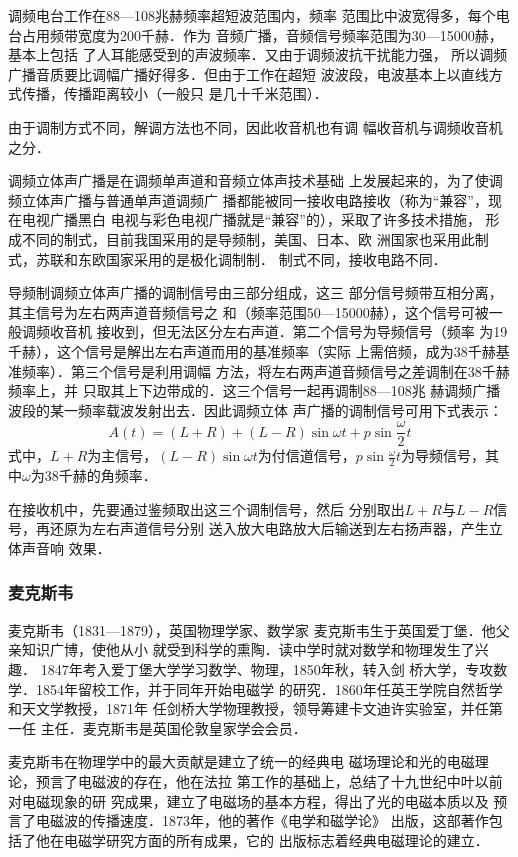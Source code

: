 调频电台工作在88—108兆赫频率超短波范围内，频率
范围比中波宽得多，每个电台占用频带宽度为200千赫．作为
音频广播，音频信号频率范围为30—15000赫，基本上包括
了人耳能感受到的声波频率．又由于调频波抗干扰能力强，
所以调频广播音质要比调幅广播好得多．但由于工作在超短
波波段，电波基本上以直线方式传播，传播距离较小（一般只
是几十千米范围）．

由于调制方式不同，解调方法也不同，因此收音机也有调
幅收音机与调频收音机之分．

调频立体声广播是在调频单声道和音频立体声技术基础
上发展起来的，为了使调频立体声广播与普通单声道调频广
播都能被同一接收电路接收（称为“兼容”，现在电视广播黑白
电视与彩色电视广播就是“兼容”的），采取了许多技术措施，
形成不同的制式，目前我国采用的是导频制，美国、日本、欧
洲国家也采用此制式，苏联和东欧国家采用的是极化调制制．
制式不同，接收电路不同．

导频制调频立体声广播的调制信号由三部分组成，这三
部分信号频带互相分离，其主信号为左右两声道音频信号之
和（频率范围50—15000赫），这个信号可被一般调频收音机
接收到，但无法区分左右声道．第二个信号为导频信号（频率
为19千赫），这个信号是解出左右声道而用的基准频率（实际
上需倍频，成为38千赫基准频率）．第三个信号是利用调幅
方法，将左右两声道音频信号之差调制在38千赫频率上，并
只取其上下边带成的．这三个信号一起再调制88—108兆
赫调频广播波段的某一频率载波发射出去．因此调频立体
声广播的调制信号可用下式表示：
\[A(t)=(L+R)+(L-R)\sin\omega t+p\sin\frac{\omega}{2}
t\]
式中，$L+R$为主信号，$(L-R)\sin\omega t$为付信道信号，$p\sin\frac{\omega}{2}t$为导频信号，其中$\omega$为38千赫的角频率．

在接收机中，先要通过鉴频取出这三个调制信号，然后
分别取出$L+R$与$L-R$信号，再还原为左右声道信号分别
送入放大电路放大后输送到左右扬声器，产生立体声音响
效果．

\subsubsection{麦克斯韦}

麦克斯韦（1831—1879），英国物理学家、数学家
麦克斯韦生于英国爱丁堡．他父亲知识广博，使他从小
就受到科学的熏陶．读中学时就对数学和物理发生了兴趣．
1847年考入爱丁堡大学学习数学、物理，1850年秋，转入剑
桥大学，专攻数学．1854年留校工作，并于同年开始电磁学
的研究．1860年任英王学院自然哲学和天文学教授，1871年
任剑桥大学物理教授，领导筹建卡文迪许实验室，并任第一任
主任．麦克斯韦是英国伦敦皇家学会会员．

麦克斯韦在物理学中的最大贡献是建立了统一的经典电
磁场理论和光的电磁理论，预言了电磁波的存在，他在法拉
第工作的基础上，总结了十九世纪中叶以前对电磁现象的研
究成果，建立了电磁场的基本方程，得出了光的电磁本质以及
预言了电磁波的传播速度．1873年，他的著作《电学和磁学论》
出版，这部著作包括了他在电磁学研究方面的所有成果，它的
出版标志着经典电磁理论的建立．

